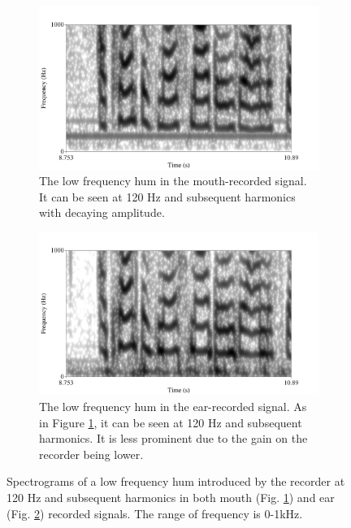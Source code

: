 \documentclass[dissertation,copyright]{uathesis}
\begin{document}
\begin{figure}[h]
\centering
\begin{subfigure}{0.475\textwidth}
  \centering
  \includegraphics[width=1\linewidth]{figure/low_frequency_hum.png}
  \caption{The low frequency hum in the mouth-recorded signal.  It can be seen at 120 Hz and subsequent harmonics with decaying amplitude.}
  \label{fig:low_freq_hum-mouth}
\end{subfigure}%
\hfill
\begin{subfigure}{0.475\textwidth}
  \centering
  \includegraphics[width=1\linewidth]{figure/low_frequency_hum-ear.png}
  \caption{The low frequency hum in the ear-recorded signal. As in Figure \ref{fig:low_freq_hum-mouth}, it can be seen at 120 Hz and subsequent harmonics.  It is less prominent due to the gain on the recorder being lower.}
  \label{fig:low_freq_hum-ear}
\end{subfigure}
\caption{Spectrograms of a low frequency hum introduced by the recorder at 120 Hz and subsequent harmonics in both mouth (Fig. \ref{fig:low_freq_hum-mouth}) and ear (Fig. \ref{fig:low_freq_hum-ear}) recorded signals. The range of frequency is 0-1kHz.}
\label{fig:low_freq_hum}
\end{figure}
\end{document}
